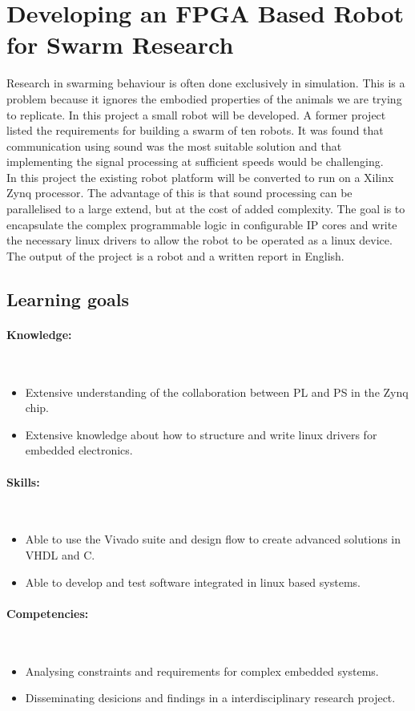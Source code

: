 \documentclass{article}
\begin{document}
\section*{Developing an FPGA Based Robot for Swarm Research}
Research in swarming behaviour is often done exclusively in simulation. 
This is a problem because it ignores the embodied properties of the animals we are trying to replicate. 
In this project a small robot will be developed. 
A former project listed the requirements for building a swarm of ten robots. 
It was found that communication using sound was the most suitable solution and that implementing the signal processing at sufficient speeds would be challenging.\\

In this project the existing robot platform will be converted to run on a Xilinx Zynq processor. 
The advantage of this is that sound processing can be parallelised to a large extend, but at the cost of added complexity. 
The goal is to encapsulate the complex programmable logic in configurable IP cores and write the necessary linux drivers to allow the robot to be operated as a linux device.\\

The output of the project is a robot and a written report in English.

\subsection*{Learning goals}  

\paragraph*{Knowledge:}~\\
\begin{itemize}
	\item Extensive understanding of the collaboration between PL and PS in the Zynq chip.
	\item Extensive knowledge about how to structure and write linux drivers for embedded electronics.
\end{itemize}
  
\paragraph*{Skills:}~\\
\begin{itemize}
	\item Able to use the Vivado suite and design flow to create advanced solutions in VHDL and C.
	\item Able to develop and test software integrated in linux based systems.
\end{itemize}
 
\paragraph*{Competencies:}~\\
\begin{itemize}
	\item Analysing constraints and requirements for complex embedded systems.
	\item Disseminating desicions and findings in a interdisciplinary research project.
\end{itemize}
\end{document}
